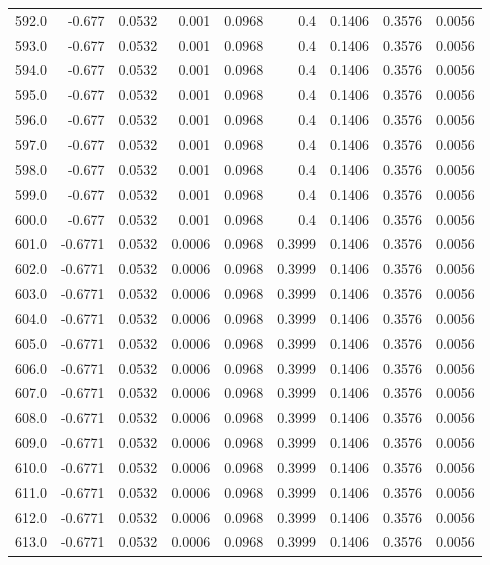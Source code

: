 \begin{longtable}{lrrrrrrrr}
592.0 & -0.677 & 0.0532 & 0.001 & 0.0968 & 0.4 & 0.1406 & 0.3576 & 0.0056 \\
593.0 & -0.677 & 0.0532 & 0.001 & 0.0968 & 0.4 & 0.1406 & 0.3576 & 0.0056 \\
594.0 & -0.677 & 0.0532 & 0.001 & 0.0968 & 0.4 & 0.1406 & 0.3576 & 0.0056 \\
595.0 & -0.677 & 0.0532 & 0.001 & 0.0968 & 0.4 & 0.1406 & 0.3576 & 0.0056 \\
596.0 & -0.677 & 0.0532 & 0.001 & 0.0968 & 0.4 & 0.1406 & 0.3576 & 0.0056 \\
597.0 & -0.677 & 0.0532 & 0.001 & 0.0968 & 0.4 & 0.1406 & 0.3576 & 0.0056 \\
598.0 & -0.677 & 0.0532 & 0.001 & 0.0968 & 0.4 & 0.1406 & 0.3576 & 0.0056 \\
599.0 & -0.677 & 0.0532 & 0.001 & 0.0968 & 0.4 & 0.1406 & 0.3576 & 0.0056 \\
600.0 & -0.677 & 0.0532 & 0.001 & 0.0968 & 0.4 & 0.1406 & 0.3576 & 0.0056 \\
601.0 & -0.6771 & 0.0532 & 0.0006 & 0.0968 & 0.3999 & 0.1406 & 0.3576 & 0.0056 \\
602.0 & -0.6771 & 0.0532 & 0.0006 & 0.0968 & 0.3999 & 0.1406 & 0.3576 & 0.0056 \\
603.0 & -0.6771 & 0.0532 & 0.0006 & 0.0968 & 0.3999 & 0.1406 & 0.3576 & 0.0056 \\
604.0 & -0.6771 & 0.0532 & 0.0006 & 0.0968 & 0.3999 & 0.1406 & 0.3576 & 0.0056 \\
605.0 & -0.6771 & 0.0532 & 0.0006 & 0.0968 & 0.3999 & 0.1406 & 0.3576 & 0.0056 \\
606.0 & -0.6771 & 0.0532 & 0.0006 & 0.0968 & 0.3999 & 0.1406 & 0.3576 & 0.0056 \\
607.0 & -0.6771 & 0.0532 & 0.0006 & 0.0968 & 0.3999 & 0.1406 & 0.3576 & 0.0056 \\
608.0 & -0.6771 & 0.0532 & 0.0006 & 0.0968 & 0.3999 & 0.1406 & 0.3576 & 0.0056 \\
609.0 & -0.6771 & 0.0532 & 0.0006 & 0.0968 & 0.3999 & 0.1406 & 0.3576 & 0.0056 \\
610.0 & -0.6771 & 0.0532 & 0.0006 & 0.0968 & 0.3999 & 0.1406 & 0.3576 & 0.0056 \\
611.0 & -0.6771 & 0.0532 & 0.0006 & 0.0968 & 0.3999 & 0.1406 & 0.3576 & 0.0056 \\
612.0 & -0.6771 & 0.0532 & 0.0006 & 0.0968 & 0.3999 & 0.1406 & 0.3576 & 0.0056 \\
613.0 & -0.6771 & 0.0532 & 0.0006 & 0.0968 & 0.3999 & 0.1406 & 0.3576 & 0.0056 \\

\end{longtable}
